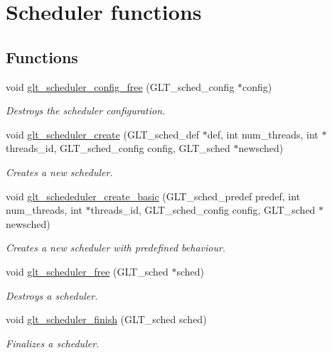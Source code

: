 \hypertarget{group__SCHED}{\section{Scheduler functions}
\label{group__SCHED}
}
\subsection*{Functions}
\begin{DoxyCompactItemize}
\item 
void \hyperlink{group__SCHED_ga76838701f9ab543f1b68660bb9544bdb}{glt\-\_\-scheduler\-\_\-config\-\_\-free} (G\-L\-T\-\_\-sched\-\_\-config $\ast$config)
\begin{DoxyCompactList}\small\item\em Destroys the scheduler configuration. \end{DoxyCompactList}\item 
void \hyperlink{group__SCHED_gade3126dca3b35d86917dbab513e9b198}{glt\-\_\-scheduler\-\_\-create} (G\-L\-T\-\_\-sched\-\_\-def $\ast$def, int num\-\_\-threads, int $\ast$threads\-\_\-id, G\-L\-T\-\_\-sched\-\_\-config config, G\-L\-T\-\_\-sched $\ast$newsched)
\begin{DoxyCompactList}\small\item\em Creates a new scheduler. \end{DoxyCompactList}\item 
void \hyperlink{group__SCHED_gaeae5db1ee6507774e5aa31244de9b820}{glt\-\_\-schededuler\-\_\-create\-\_\-basic} (G\-L\-T\-\_\-sched\-\_\-predef predef, int num\-\_\-threads, int $\ast$threads\-\_\-id, G\-L\-T\-\_\-sched\-\_\-config config, G\-L\-T\-\_\-sched $\ast$newsched)
\begin{DoxyCompactList}\small\item\em Creates a new scheduler with predefined behaviour. \end{DoxyCompactList}\item 
void \hyperlink{group__SCHED_ga35f2b8129d924c1b53f8ffe5d36a895c}{glt\-\_\-scheduler\-\_\-free} (G\-L\-T\-\_\-sched $\ast$sched)
\begin{DoxyCompactList}\small\item\em Destroys a scheduler. \end{DoxyCompactList}\item 
void \hyperlink{group__SCHED_ga04724f9b33887333c478744fa2714b3c}{glt\-\_\-scheduler\-\_\-finish} (G\-L\-T\-\_\-sched sched)
\begin{DoxyCompactList}\small\item\em Finalizes a scheduler. \end{DoxyCompactList}\item 

\end{DoxyCompactItemize}
